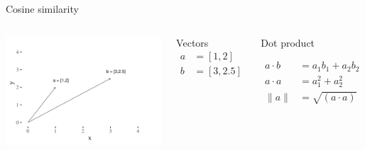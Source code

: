 \documentclass[
  10pt,
  ignorenonframetext,
  x11names, dvipsnames, bibspacing,natbib, table]{beamer}
\begin{document}
\begin{frame}{Cosine similarity}
\protect\hypertarget{cosine-similarity}{}
\begin{columns}
    

\begin{center}\includegraphics[width=1.15\linewidth]{presentationBoston_files/figure-beamer/cosine1-1} \end{center}



\footnotesize 

\begin{block}{Vectors}
\begin{align*}
a  & = [1,2]\\
b  &= [3,2.5]
\end{align*}

\end{block}
\pause 

\begin{block}{Dot product}


\begin{align*}
a \cdot b & = a_1 b_1 + a_2 b_2\\
a \cdot a & = a_1^2 + a_2 ^ 2 \\
\lVert a\rVert & = \sqrt{(a \cdot a)}
\end{align*}

\end{block}



\end{columns}
\end{frame}
\end{document}
